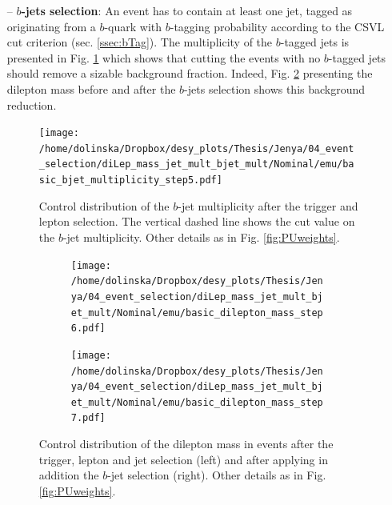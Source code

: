\begin{itemize}
%  
 \item [--] \textbf{$b$-jets selection}: An event has to contain at least one jet, tagged as originating from a $b$-quark with $b$-tagging probability according to the CSVL cut criterion (sec. \ref{ssec:bTag}). 
 The multiplicity of the $b$-tagged jets is presented in Fig. \ref{fig:bjetMultiSel} which shows that cutting the events with no $b$-tagged jets should remove a sizable background fraction. 
 Indeed, Fig. \ref{fig:mllbJetSel} presenting the dilepton mass before and after the $b$-jets selection shows this background reduction.
 
 \begin{figure}[h]
  \centering
  \texttt{[image: /home/dolinska/Dropbox/desy\_plots/Thesis/Jenya/04\_event\_selection/diLep\_mass\_jet\_mult\_bjet\_mult/Nominal/emu/basic\_bjet\_multiplicity\_step5.pdf]}
  \caption{Control distribution of the $b$-jet multiplicity after the trigger and lepton selection. The vertical dashed line shows the cut value on the $b$-jet multiplicity.
   Other details as in Fig. \ref{fig:PUweights}.}
  \label{fig:bjetMultiSel}
  \end{figure}
  
 \begin{figure}[h]
 \centering
 \begin{subfigure}
   \centering
   \texttt{[image: /home/dolinska/Dropbox/desy\_plots/Thesis/Jenya/04\_event\_selection/diLep\_mass\_jet\_mult\_bjet\_mult/Nominal/emu/basic\_dilepton\_mass\_step6.pdf]}
 \end{subfigure}
 \begin{subfigure}
   \centering
   \texttt{[image: /home/dolinska/Dropbox/desy\_plots/Thesis/Jenya/04\_event\_selection/diLep\_mass\_jet\_mult\_bjet\_mult/Nominal/emu/basic\_dilepton\_mass\_step7.pdf]}
 \end{subfigure}
 \caption{Control distribution of the dilepton mass in events after the trigger, lepton and jet selection (left) and after applying in addition the $b$-jet selection (right). 
 Other details as in Fig. \ref{fig:PUweights}.}
 \label{fig:mllbJetSel}
 \end{figure}
 

\end{itemize}
